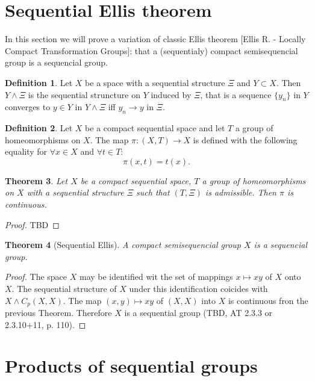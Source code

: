\documentclass[12pt]{article}
\newtheorem{theorem}{Theorem}
\theoremstyle{definition}
\newtheorem{define}[theorem]{Definition}
\theoremstyle{remark}
\begin{document}
\section*{Sequential Ellis theorem}

In this section we will prove a variation of classic Ellis theorem [Ellis R. - Locally Compact Transformation Groups]: that a (sequentialy) compact semisequencial group is a sequencial group.

\begin{define}\label{def:idnseqstr}
Let $X$ be a space with a sequential structure $\Xi$ and $Y\subset X$. Then $Y\wedge \Xi$ is the sequential struncture on $Y$ induced by $\Xi$, that is a sequence $\{y_n\}$ in $Y$ converges to $y\in Y$ in $Y\wedge \Xi$ iff $y_n\to y$ in $\Xi$.
\end{define}

\begin{define}\label{def:}
Let $X$ be a compact sequential space and let $T$ a group of homeomorphisms on $X$. The map $\pi: (X,T)\to X$ is defined with the following equality for $\forall x\in X$ and $\forall t\in T$:
\[
    \pi(x,t) = t(x).
\]
\end{define}

\begin{theorem}\label{th:}
Let $X$ be a compact sequential space, $T$ a group of homeomorphisms on $X$ with a sequential structure $\Xi$ such that $(T,\Xi)$ is admissible. Then $\pi$ is continuous.
\end{theorem}
\begin{proof}
TBD
\end{proof}

\begin{theorem}[Sequential Ellis]\label{th:sqellis}
A compact semisequencial group $X$ is a sequencial group.
\end{theorem}
\begin{proof}
The space $X$ may be identified wit the set of mappings $x\mapsto xy$ of $X$ onto $X$. The sequential structure of $X$ under this identification coicides with $X\wedge C_p(X,X)$. The map $(x,y)\mapsto xy$ of $(X,X)$ into $X$ is continuous fron the previous Theorem. Therefore $X$ is a sequential group (TBD, AT 2.3.3 or 2.3.10+11, p. 110).
\end{proof}

\section*{Products of sequential groups}
\end{document}
